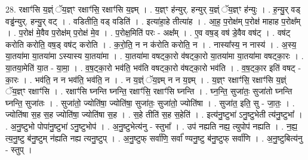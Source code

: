\documentclass[17pt]{extarticle}
\begin{document}
28. रक्षाꣳ॑सि य॒ज्ञ्ं ॅय॒ज्ञ्ꣳ रक्षाꣳ॑सि॒ रक्षाꣳ॑सि य॒ज्ञ्म् । . य॒ज्ञ्ꣳ ह॑न्युर्. हन्युर् य॒ज्ञ्ं ॅय॒ज्ञ्ꣳ ह॑न्युः । . ह॒न्यु॒र् वड् वड्ढ॑न्युर्. हन्यु॒र् वट् । . वडितीति॒ वड् वडिति॑ । . इत्या॑हा॒हे तीत्या॑ह । . आ॒ह॒ प॒रोक्ष॑म् प॒रोक्ष॑ माहाह प॒रोक्ष᳚म् । . प॒रोक्ष॑ मे॒वैव प॒रोक्ष॑म् प॒रोक्ष॑ मे॒व । . प॒रोक्ष॒मिति॑ परः - अक्ष᳚म् । . ए॒व वष॒ड् वष॑ डे॒वैव वष॑ट् । . वष॑ट् करोति करोति॒ वष॒ड् वष॑ट् करोति । . क॒रो॒ति॒ न न क॑रोति करोति॒ न । . नास्या᳚स्य॒ न नास्य॑ । . अ॒स्य॒ या॒तया॑मा या॒तया॑मा ऽस्यास्य या॒तया॑मा । . या॒तया॑मा वषट्का॒रो व॑षट्का॒रो या॒तया॑मा या॒तया॑मा वषट्का॒रः । . या॒तया॒मेति॑ या॒त - या॒मा॒ । . व॒ष॒ट्का॒रो भव॑ति॒ भव॑ति वषट्का॒रो व॑षट्का॒रो भव॑ति । . व॒ष॒ट्का॒र इति॑ वषट् - का॒रः । . भव॑ति॒ न न भव॑ति॒ भव॑ति॒ न । . न य॒ज्ञ्ं ॅय॒ज्ञ्म् न न य॒ज्ञ्म् । . य॒ज्ञ्ꣳ रक्षाꣳ॑सि॒ रक्षाꣳ॑सि य॒ज्ञ्ं ॅय॒ज्ञ्ꣳ रक्षाꣳ॑सि । . रक्षाꣳ॑सि घ्नन्ति घ्नन्ति॒ रक्षाꣳ॑सि॒ रक्षाꣳ॑सि घ्नन्ति । . घ्न॒न्ति॒ सुजा॑तः॒ सुजा॑तो घ्नन्ति घ्नन्ति॒ सुजा॑तः । . सुजा॑तो॒ ज्योति॑षा॒ ज्योति॑षा॒ सुजा॑तः॒ सुजा॑तो॒ ज्योति॑षा । . सुजा॑त॒ इति॒ सु - जा॒तः॒ । . ज्योति॑षा स॒ह स॒ह ज्योति॑षा॒ ज्योति॑षा स॒ह । . स॒हे तीति॑ स॒ह स॒हेति॑ । . इत्य॑नु॒ष्टुभा॑ ऽनु॒ष्टुभेती त्य॑नु॒ष्टुभा᳚ । . अ॒नु॒ष्टुभो पोपा॑नु॒ष्टुभा॑ ऽनु॒ष्टुभोप॑ । . अ॒नु॒ष्टुभेत्य॑नु - स्तुभा᳚ । . उप॑ नह्यति नह्य॒ त्युपोप॑ नह्यति । . न॒ह्य॒ त्य॒नु॒ष्टु ब॑नु॒ष्टुम् न॑ह्यति नह्य त्यनु॒ष्टुप् । . अ॒नु॒ष्टुफ् सर्वा॑णि॒ सर्वा᳚ ण्यनु॒ष्टु ब॑नु॒ष्टुफ् सर्वा॑णि । . अ॒नु॒ष्टुबित्य॑नु - स्तुप् । \newline
\end{document}
